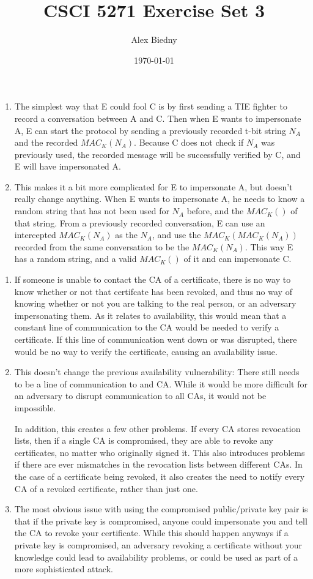 \documentclass{jhwhw}
\title{CSCI 5271 Exercise Set 3}
\author{Alex Biedny}
\date{\today}
\begin{document}
\maketitle

\begin{enumerate}
\item The simplest way that E could fool C is by first sending a TIE fighter to record a conversation between A and C. Then when E wants to impersonate A, E can start the protocol by sending a previously recorded t-bit string $N_A$ and the recorded $MAC_K(N_A)$. Because C does not check if $N_A$ was previously used, the recorded message will be successfully verified by C, and E will have impersonated A.
\item This makes it a bit more complicated for E to impersonate A, but doesn't really change anything. When E wants to impersonate A, he needs to know a random string that has not been used for $N_A$ before, and the $MAC_K()$ of that string. From a previously recorded conversation, E can use an intercepted $MAC_K(N_A)$ as the $N_A$, and use the $MAC_K(MAC_K(N_A))$ recorded from the same conversation to be the $MAC_K(N_A)$. This way E has a random string, and a valid $MAC_K()$ of it and can impersonate C.
\end{enumerate}

\begin{enumerate}
\item If someone is unable to contact the CA of a certificate, there is no way to know whether or not that certifcate has been revoked, and thus no way of knowing whether or not you are talking to the real person, or an adversary impersonating them. As it relates to availability, this would mean that a constant line of communication to the CA would be needed to verify a certificate. If this line of communication went down or was disrupted, there would be no way to verify the certificate, causing an availability issue.
\item This doesn't change the previous availability vulnerability: There still needs to be a line of communication to and CA. While it would be more difficult for an adversary to disrupt communication to all CAs, it would not be impossible.

In addition, this creates a few other problems. If every CA stores revocation lists, then if a single CA is compromised, they are able to revoke any certificates, no matter who originally signed it. This also introduces problems if there are ever mismatches in the revocation lists between different CAs. In the case of a certificate being revoked, it also creates the need to notify every CA of a revoked certificate, rather than just one.
\item The most obvious issue with using the compromised public/private key pair is that if the private key is compromised, anyone could impersonate you and tell the CA to revoke your certificate. While this should happen anyways if a private key is compromised, an adversary revoking a certificate without your knowledge could lead to availability problems, or could be used as part of a more sophisticated attack.
\end{enumerate}
\end{document}
